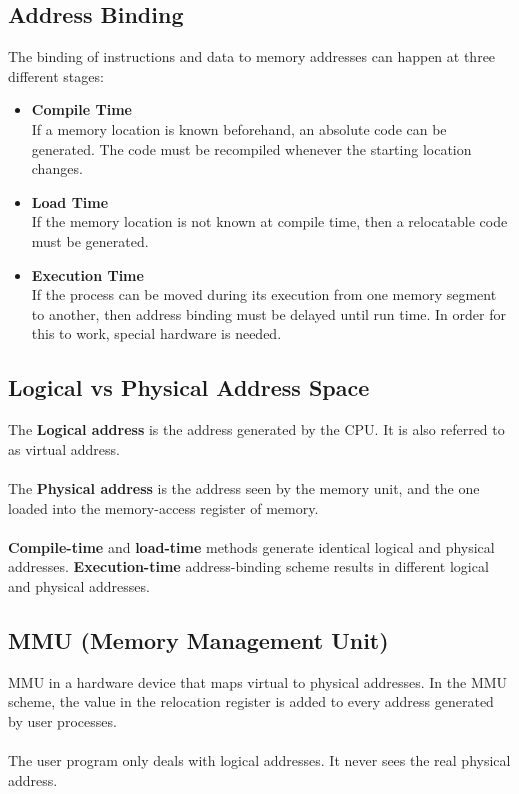 \documentclass{article}
\begin{document}
\subsection{Address Binding}
The binding of instructions and data to memory addresses can happen at three different stages:

\begin{itemize}
	\item \textbf{Compile Time}
	\vspace{.2cm} \\
	If a memory location is known beforehand, an absolute code can be generated. The code must be recompiled whenever the starting location changes.
	
	\item \textbf{Load Time}
	\vspace{.2cm} \\
	If the memory location is not known at compile time, then a relocatable code must be generated.
	
	\item \textbf{Execution Time}
	\vspace{.2cm} \\
	If the process can be moved during its execution from one memory segment to another, then address binding must be delayed until run time. In order for this to work, special hardware is needed.
\end{itemize}

\subsection{Logical vs Physical Address Space}
The \textbf{Logical address} is the address generated by the CPU. It is also referred to as virtual address. \\ \\
The \textbf{Physical address} is the address seen by the memory unit, and the one loaded into the memory-access register of memory. \\ \\
\textbf{Compile-time} and \textbf{load-time} methods generate identical logical and physical addresses. \textbf{Execution-time} address-binding scheme results in different logical and physical addresses.

\subsection{MMU (Memory Management Unit)}
MMU in a hardware device that maps virtual to physical addresses. In the MMU scheme, the value in the relocation register is added to every address generated by user processes. \\ \\
The user program only deals with logical addresses. It never sees the real physical address.
\end{document}
